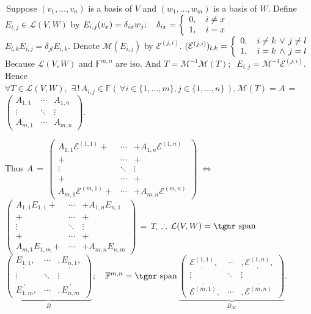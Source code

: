 \documentclass[a4paper, 11pt, UTF8]{article}
\def\Spn{{\textup{\tgnr span}}\,}
\def\Lm{\mathcal{L}}
\def\Mt{\mathcal{M}}
\def\Fbb{{\mathbb{F}}}
\def\BulletPoint{{\small\bullet}}
\begin{document}
\begin{large}
\BulletPoint \,\hspace{1pt}\NoteFor{[3.60]}\;\;Suppose $(v_1,\dots,v_n)$ is a basis of $V$ and $(w_1,\dots,w_m)$ is a basis of $W$.\TextB{\vspace{10pt}}
{Define $E_{i,j}\in\Lm(V,W)$ by $E_{i,j}(v_x)=\delta_{ix} w_j;\quad\delta_{ix}=\MathLeftBrace{l}{0,\quad i\neq x\\1,\quad i=x}\quad$} \Corollary\,\,\, {\Large$E_{l,k}E_{i,j}=\delta_{jl}E_{i,k}.$}\TextB{}
{\Large Denote $\Mt(E_{i,j})$ by $\mathcal{E}^{(j,i)}.$ $(\mathcal{E}^{(j,i)})_{l,k}=\MathLeftBrace{l}{0,\quad i\neq k\,\vee\,j\neq l\\1,\quad i=k\,\wedge\,j=l}$}\TextB{\vspace{6pt}}
{\Large Because $\Lm(V,W)$ and $\Fbb^{m,n}$ are iso. And $T=\Mt^{-1}\Mt(T);\;\;E_{i,j}=\Mt^{-1}\mathcal{E}^{(j,i)}$.}\TextB{}
Hence $\forall T\in\Lm(V,W),\,\,\exists\,!\,A_{i,j}\in\Fbb(\,\forall i\in\{1,\dots,m\},j\in\{1,\dots,n\}\,),\Mt(T)=A\,=\,${\normalsize$\begin{pmatrix} A_{1,1} & \cdots & A_{1,n}\\ \vdots & \ddots & \vdots\\ A_{m,1} & \cdots & A_{m,n}\end{pmatrix}$}.\par\quad
Thus $A\,=\,${\normalsize$\begin{pmatrix}
		A_{1,1}\mathcal{E}^{(1,1)}+&\cdots &+A_{1,n}\mathcal{E}^{(1,n)}\\
		+&\cdots &+\\
		\vdots & \ddots & \vdots\\
		+&\cdots &+\\
		A_{m,1}\mathcal{E}^{(m,1)}+&\cdots&+A_{m,n}\mathcal{E}^{(m,n)}
	\end{pmatrix} $}$\;\Longleftrightarrow\;${\normalsize$\begin{pmatrix}
		A_{1,1}E_{1,1}+&\cdots &+A_{1,n}E_{n,1}\\
		+&\cdots & +\\
		\vdots & \ddots & \vdots\\
		+&\cdots & +\\
		A_{m,1}E_{1,m}+&\cdots &+A_{m,n}E_{n,m}
	\end{pmatrix}$}$\,=\,T$.\vspace{6pt}\TextB{}
$\therefore\,\Lm(V,W)=\Spn${\normalsize$\underbrace{\begin{pmatrix} \underset{,}{E_{1,1}}, & \cdots & ,\underset{,}{E_{n,1}},\\ \vdots & \ddots & \vdots\\ \overset{,}{E_{1,m}}, & \cdots & ,\overset{,}{E_{n,m}}\end{pmatrix}}_{B}$}$;\quad\Fbb^{m,n}=\Spn${\normalsize$\underbrace{\begin{pmatrix} \underset{,}{\mathcal{E}^{(1,1)}}, & \cdots & ,\underset{,}{\mathcal{E}^{(1,n)}},\\ \vdots & \ddots & \vdots\\ \overset{,}{\mathcal{E}^{(m,1)}}, & \cdots & ,\overset{,}{\mathcal{E}^{(m,n)}}\end{pmatrix}}_{B_{\Mt}}$}.\TextB{\vspace{12pt}}

\end{large}
\end{document}
